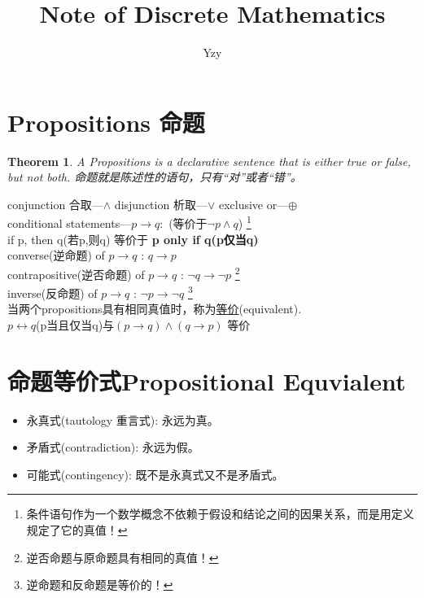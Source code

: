 \documentclass{article}
\begin{document}
    \title{Note of Discrete Mathematics}
    \author{Yzy}
    \maketitle
    \tableofcontents
    
    \newtheorem{theorem}{Theorem}
    \section{Propositions 命题}
   
    \begin{theorem}
        A Propositions is a declarative  sentence that is either true or false, but not both. 
        命题就是陈述性的语句，只有“对”或者“错”。
    \end{theorem}
    conjunction 合取---$\wedge$ \quad
    disjunction 析取---$\vee$ \quad
    exclusive or---${\oplus}$ \\
    conditional statements---$p{\rightarrow}q:$ (等价于$\neg p \wedge q$)
    \footnote{条件语句作为一个数学概念不依赖于假设和结论之间的因果关系，而是用定义规定了它的真值！}
    \\
    if p, then q(若p,则q) 等价于 \textbf{p only if q(p仅当q)}
    \\
    converse(逆命题) of $p\rightarrow q$ : $q{\rightarrow}p$ \\
    contrapositive(逆否命题) of $p{\rightarrow}q$ : $\neg q{\rightarrow} \neg p$ 
    \footnote{逆否命题与原命题具有相同的真值！} 
    \\
    inverse(反命题) of $p{\rightarrow}q$ : $\neg p \rightarrow \neg q$ 
    \footnote{逆命题和反命题是等价的！}
    \\
    当两个propositions具有相同真值时，称为\underline{等价}(equivalent).\\
    $p{\leftrightarrow}q$(p当且仅当q)与$(p\rightarrow q)\wedge (q\rightarrow p)$ 等价\\

    \section{命题等价式Propositional Equvialent}
    \begin{itemize}
        \item 永真式(tautology 重言式): 永远为真。
        \item 矛盾式(contradiction): 永远为假。
        \item 可能式(contingency): 既不是永真式又不是矛盾式。
    \end{itemize}
\end{document}
